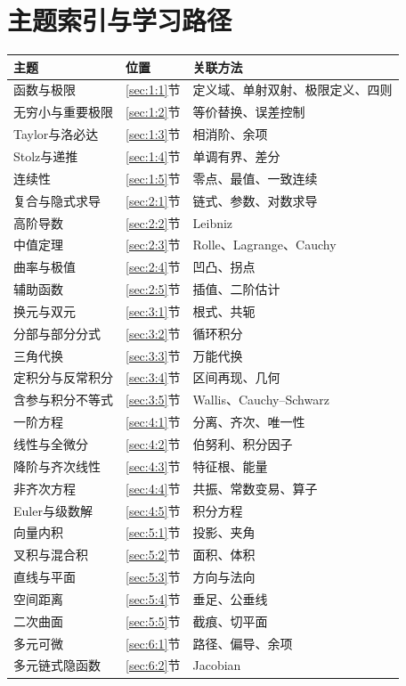 \chapter{主题索引与学习路径}\label{app:index}
\begin{longtable}{p{37mm}p{18mm}p{66mm}}\toprule 主题&位置&关联方法\\\midrule\endhead
函数与极限&\ref{sec:1:1}节&定义域、单射双射、极限定义、四则\\
无穷小与重要极限&\ref{sec:1:2}节&等价替换、误差控制\\
Taylor与洛必达&\ref{sec:1:3}节&相消阶、余项\\
Stolz与递推&\ref{sec:1:4}节&单调有界、差分\\
连续性&\ref{sec:1:5}节&零点、最值、一致连续\\
复合与隐式求导&\ref{sec:2:1}节&链式、参数、对数求导\\
高阶导数&\ref{sec:2:2}节&Leibniz\\
中值定理&\ref{sec:2:3}节&Rolle、Lagrange、Cauchy\\
曲率与极值&\ref{sec:2:4}节&凹凸、拐点\\
辅助函数&\ref{sec:2:5}节&插值、二阶估计\\
换元与双元&\ref{sec:3:1}节&根式、共轭\\
分部与部分分式&\ref{sec:3:2}节&循环积分\\
三角代换&\ref{sec:3:3}节&万能代换\\
定积分与反常积分&\ref{sec:3:4}节&区间再现、几何\\
含参与积分不等式&\ref{sec:3:5}节&Wallis、Cauchy--Schwarz\\
一阶方程&\ref{sec:4:1}节&分离、齐次、唯一性\\
线性与全微分&\ref{sec:4:2}节&伯努利、积分因子\\
降阶与齐次线性&\ref{sec:4:3}节&特征根、能量\\
非齐次方程&\ref{sec:4:4}节&共振、常数变易、算子\\
Euler与级数解&\ref{sec:4:5}节&积分方程\\
向量内积&\ref{sec:5:1}节&投影、夹角\\
叉积与混合积&\ref{sec:5:2}节&面积、体积\\
直线与平面&\ref{sec:5:3}节&方向与法向\\
空间距离&\ref{sec:5:4}节&垂足、公垂线\\
二次曲面&\ref{sec:5:5}节&截痕、切平面\\
多元可微&\ref{sec:6:1}节&路径、偏导、余项\\
多元链式隐函数&\ref{sec:6:2}节&Jacobian\\

\end{longtable}
